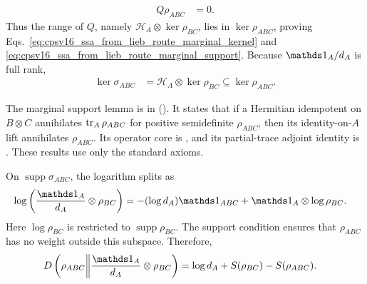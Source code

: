 \documentclass[11pt]{article}
\begin{document}
\begin{enumerate}
\begin{align}
        Q\rho_{ABC}
            &= 0.
        \label{eq:cpsv16_ssa_from_lieb_route_projection_state_zero}
    \end{align}
    Thus the range of $Q$, namely
    $\mathcal H_A\otimes\ker\rho_{BC}$, lies in $\ker\rho_{ABC}$, proving
    Eqs.~\ref{eq:cpsv16_ssa_from_lieb_route_marginal_kernel} and
    \ref{eq:cpsv16_ssa_from_lieb_route_marginal_support}. Because
    $\Id_A/d_A$ is full rank,
    \begin{align}
        \ker\sigma_{ABC}
            &= \mathcal H_A\otimes\ker\rho_{BC}
            \subseteq\ker\rho_{ABC}.
        \label{eq:cpsv16_ssa_from_lieb_route_reference_kernel_condition}
    \end{align}

    The marginal support lemma is
     in
    (). It states that if a
    Hermitian idempotent on $B\otimes C$ annihilates
    $\operatorname{tr}_A\rho_{ABC}$ for positive semidefinite $\rho_{ABC}$, then its
    identity-on-$A$ lift annihilates $\rho_{ABC}$. Its operator core is
    , and its
    partial-trace adjoint identity is
    . These results use only the standard
    \Lean{} axioms.

    On $\operatorname{supp}\sigma_{ABC}$, the logarithm splits as
    \begin{align}
        \log\left(\frac{\Id_A}{d_A}\otimes\rho_{BC}\right)
            &= -(\log d_A)\Id_{ABC}
              +\Id_A\otimes\log\rho_{BC}.
        \label{eq:cpsv16_ssa_from_lieb_route_reference_logarithm}
    \end{align}
    Here $\log\rho_{BC}$ is restricted to
    $\operatorname{supp}\rho_{BC}$. The support condition ensures that
    $\rho_{ABC}$ has no weight outside this subspace. Therefore,
    \begin{align}
        D\left(\rho_{ABC} \middle\|
          \frac{\Id_A}{d_A}\otimes\rho_{BC}\right)
            &= \log d_A+S(\rho_{BC})-S(\rho_{ABC}).
        \label{eq:cpsv16_ssa_from_lieb_route_tripartite_relative_entropy}
    \end{align}


\end{enumerate}
\end{document}
